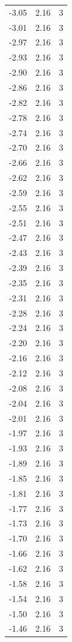 \begin{longtable}{lrr}
  -3.05 & 2.16 & 3 \\
  -3.01 & 2.16 & 3 \\
  -2.97 & 2.16 & 3 \\
  -2.93 & 2.16 & 3 \\
  -2.90 & 2.16 & 3 \\
  -2.86 & 2.16 & 3 \\
  -2.82 & 2.16 & 3 \\
  -2.78 & 2.16 & 3 \\
  -2.74 & 2.16 & 3 \\
  -2.70 & 2.16 & 3 \\
  -2.66 & 2.16 & 3 \\
  -2.62 & 2.16 & 3 \\
  -2.59 & 2.16 & 3 \\
  -2.55 & 2.16 & 3 \\
  -2.51 & 2.16 & 3 \\
  -2.47 & 2.16 & 3 \\
  -2.43 & 2.16 & 3 \\
  -2.39 & 2.16 & 3 \\
  -2.35 & 2.16 & 3 \\
  -2.31 & 2.16 & 3 \\
  -2.28 & 2.16 & 3 \\
  -2.24 & 2.16 & 3 \\
  -2.20 & 2.16 & 3 \\
  -2.16 & 2.16 & 3 \\
  -2.12 & 2.16 & 3 \\
  -2.08 & 2.16 & 3 \\
  -2.04 & 2.16 & 3 \\
  -2.01 & 2.16 & 3 \\
  -1.97 & 2.16 & 3 \\
  -1.93 & 2.16 & 3 \\
  -1.89 & 2.16 & 3 \\
  -1.85 & 2.16 & 3 \\
  -1.81 & 2.16 & 3 \\
  -1.77 & 2.16 & 3 \\
  -1.73 & 2.16 & 3 \\
  -1.70 & 2.16 & 3 \\
  -1.66 & 2.16 & 3 \\
  -1.62 & 2.16 & 3 \\
  -1.58 & 2.16 & 3 \\
  -1.54 & 2.16 & 3 \\
  -1.50 & 2.16 & 3 \\
  -1.46 & 2.16 & 3 \\

\end{longtable}
